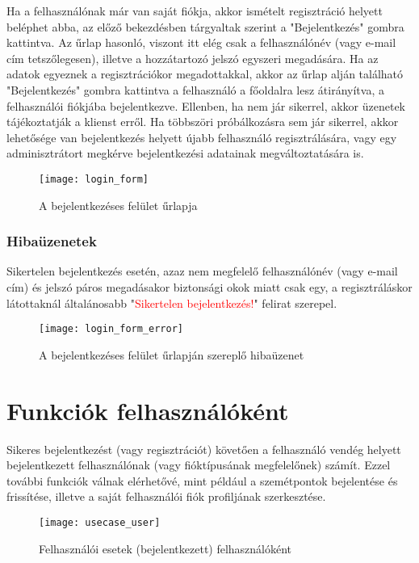 Ha a felhasználónak már van saját fiókja, akkor ismételt regisztráció helyett beléphet abba, az előző bekezdésben tárgyaltak szerint a "Bejelentkezés" gombra kattintva. Az űrlap hasonló, viszont itt elég csak a felhasználónév (vagy e-mail cím tetszőlegesen), illetve a hozzátartozó jelszó egyszeri megadására. Ha az adatok egyeznek a regisztrációkor megadottakkal, akkor az űrlap alján található "Bejelentkezés" gombra kattintva a felhasználó a főoldalra lesz átirányítva, a felhasználói fiókjába bejelentkezve. Ellenben, ha nem jár sikerrel, akkor üzenetek tájékoztatják a klienst erről. Ha többszöri próbálkozásra sem jár sikerrel, akkor lehetősége van bejelentkezés helyett újabb felhasználó regisztrálására, vagy egy adminisztrátort megkérve bejelentkezési adatainak megváltoztatására is.

\begin{figure}[H]
	\centering
	\texttt{[image: login\_form]}
	\caption{A bejelentkezéses felület űrlapja}
	\label{fig:login_form}
\end{figure}

\subsubsection{Hibaüzenetek}

Sikertelen bejelentkezés esetén, azaz nem megfelelő felhasználónév (vagy e-mail cím) és jelszó páros megadásakor biztonsági okok miatt csak egy, a regisztráláskor látottaknál általánosabb "\textcolor{red}{Sikertelen bejelentkezés!}" felirat szerepel.

\begin{figure}[H]
	\centering
	\texttt{[image: login\_form\_error]}
	\caption{A bejelentkezéses felület űrlapján szereplő hibaüzenet}
	\label{fig:login_form_error}
\end{figure}

\section{Funkciók felhasználóként}

Sikeres bejelentkezést (vagy regisztrációt) követően a felhasználó vendég helyett bejelentkezett felhasználónak (vagy fióktípusának megfelelőnek) számít. Ezzel további funkciók válnak elérhetővé, mint például a szemétpontok bejelentése és frissítése, illetve a saját felhasználói fiók profiljának szerkesztése.

\begin{figure}[H]
	\centering
	\texttt{[image: usecase\_user]}
	\caption{Felhasználói esetek (bejelentkezett) felhasználóként}
	\label{fig:usecase_user}
\end{figure}

